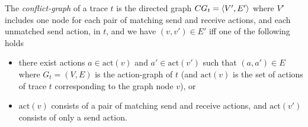 \begin{definition}\label{def:conf_graph}
    The \emph{conflict-graph} of a trace $t$ is the directed graph $CG_t=\left\langle {V',E'} \right\rangle$ where $V'$ includes one node for each pair of matching send and receive actions, and each unmatched send action, in $t$, and we have $(v,v') \in E'$ iff one of the following holds
\begin{itemize}
    	\item there exist actions $a \in \mathrm{act}(v)$ and $a' \in \mathrm{act}(v')$ such that $(a,a') \in E$ where $G_t = (V,E)$ is the action-graph of $t$ (and $\mathrm{act}(v)$ is the set of actions of trace $t$ corresponding to the graph node $v$), or
	\item $\mathrm{act}(v)$ consists of a pair of matching send and receive actions, and $\mathrm{act}(v')$ consists of only a send action.
\end{itemize}
\end{definition}



